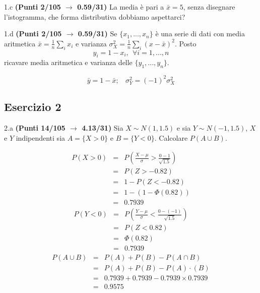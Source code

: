 \documentclass[
  11pt,
]{book}
\theoremstyle{mytheoremstyle}
\theoremstyle{mydefstyle}
\newenvironment{sol}
  {
  \begin{tcolorbox}[enhanced,breakable,arc=0.1mm,boxrule=1pt,colback=white,colframe=iblue,
  title=\bf \fontfamily{lmss}\selectfont \hspace{.5 cm} Soluzione,drop fuzzy shadow]

}{
\end{tcolorbox}
  }
\begin{document}
1.c \textbf{(Punti 2/105 \(\rightarrow\) 0.59/31)} La media è pari a \(\bar x=5\), senza disegnare l'istogramma, che forma distributiva dobbiamo aspettarci?

1.d \textbf{(Punti 2/105 \(\rightarrow\) 0.59/31)} Se \(\{x_1,...,x_n\}\) è una serie di dati con media aritmetica \(\bar x=\frac 1n\sum_i x_i\) e varianza \(\sigma_X^2=\frac 1n\sum_i(x-\bar x)^2\). Posto
\[
y_i = 1-x_i,~~\forall i=1,...,n
\]
ricavare media aritmetica e varianza delle \(\{y_1,...,y_n\}\).

\begin{sol}
\[
\bar y = 1-\bar x;~~~~\sigma_Y^2=(-1)^2\sigma_X^2
\]

\end{sol}

\subsection{Esercizio 2}\label{esercizio-2-43}

2.a \textbf{(Punti 14/105 \(\rightarrow\) 4.13/31)} Sia \(X\sim N(1,1.5)\) e sia \(Y\sim N(-1,1.5)\), \(X\) e \(Y\) indipendenti sia \(A=\{X>0\}\) e \(B=\{Y<0\}\).
Calcolare \(P(A\cup B)\).

\begin{sol}
\begin{eqnarray*}
      P( X   >   0 ) 
        &=& P\left(  \frac { X  -  \mu }{ \sigma }  >  \frac { 0  -  1 }{\sqrt{ 1.5 }} \right)  \\
                 &=& P\left(  Z   >   -0.82 \right) \\    &=& 1-P(Z< -0.82 )\\ 
                 &=&  1-(1-\Phi( 0.82 )) \\ &=&  0.7939 
      \end{eqnarray*}\begin{eqnarray*}
      P( Y   <   0 ) 
        &=& P\left(  \frac { Y  -  \mu }{ \sigma }  <  \frac { 0  -  ( -1 ) }{\sqrt{ 1.5 }} \right)  \\
                 &=& P\left(  Z   <   0.82 \right) \\    
                 &=&  \Phi( 0.82 ) \\ &=&  0.7939 
      \end{eqnarray*}\begin{eqnarray}
      P( A \cup B ) &=& P( A )+P( B )-P( A \cap B ) \\
                         &=& P( A )+P( B )-P( A )\cdot ( B ) \\
                         &=&  0.7939 + 0.7939 - 0.7939 \times 0.7939  \\
                         &=&  0.9575 \end{eqnarray}

\end{sol}
\end{document}
